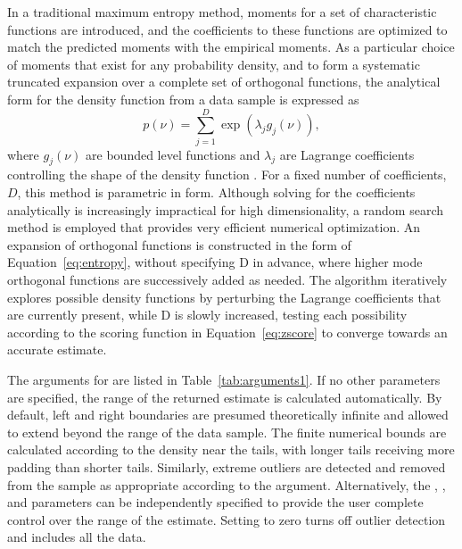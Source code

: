 In a traditional maximum entropy method, moments for a set of characteristic  functions are introduced, and the coefficients to these functions are optimized to match the predicted moments with the empirical moments. As a particular choice of moments that exist for any probability density, and to form a systematic truncated expansion over a complete set of orthogonal functions, the analytical form for the density function from a data sample is expressed as 
\begin{equation} \label{eq:entropy}
p(\nu)=\sum_{j=1}^{D}\exp\left(\lambda_jg_j(\nu)\right),
\end{equation}
where $g_j(\nu)$ are bounded level functions and $\lambda_j$ are Lagrange coefficients controlling the shape of the density function \citep{mem2}. For a fixed number of coefficients, $D$, this method is parametric in form. Although solving for the coefficients analytically is increasingly impractical for high dimensionality, a random search method is employed that provides very
efficient numerical optimization. An expansion of orthogonal functions is constructed in the form of Equation~\ref{eq:entropy}, without specifying D in advance, where higher mode orthogonal functions are successively added as needed. The algorithm iteratively explores possible density functions by perturbing the Lagrange coefficients that are currently present, while D is slowly increased, testing each possibility according to the scoring function in Equation~\ref{eq:zscore} to converge towards an accurate estimate.

The arguments for  are listed in Table~\ref{tab:arguments1}. If no other parameters are specified, the range of the returned estimate is calculated automatically.  By default, left and right boundaries are presumed theoretically infinite and allowed to extend beyond the range of the data sample. The finite numerical bounds are calculated according to the density near the tails, with longer tails receiving more padding than shorter tails.  Similarly, extreme outliers are detected and removed from the sample as appropriate according to the  argument.  Alternatively, the ,  , and  parameters can be independently specified to provide the user complete control over the range of the estimate. Setting  to zero turns off outlier detection and includes all the data.


